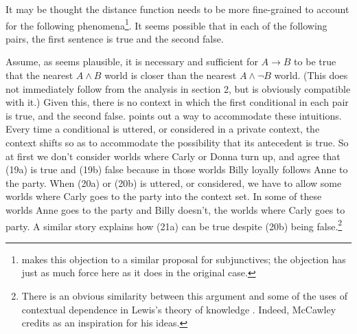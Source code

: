 It may be thought the distance function needs to be more fine-grained to account for the following phenomena\footnote{\citet{Lewis1973a} makes this objection to a similar proposal for subjunctives; the objection has just as much force here as it does in the original case.}. It seems possible that in each of the following pairs, the first sentence is true and the second false. 


\noindent Assume, as seems plausible, it is necessary and sufficient for \(A \rightarrow B\) to be true that the nearest \(A \wedge B\) world is closer than the nearest \(A\wedge \neg B\) world. (This does not immediately follow from the analysis in section 2, but is obviously compatible with it.) Given this, there is no context in which the first conditional in each pair is true, and the second false. \citet{McCawley1996} points out a way to accommodate these intuitions. Every time a conditional is uttered, or considered in a private context, the context shifts so as to accommodate the possibility that its antecedent is true. So at first we don't consider worlds where Carly or Donna turn up, and agree that (19a) is true and (19b) false because in those worlds Billy loyally follows Anne to the party. When (20a) or (20b) is uttered, or considered, we have to allow some worlds where Carly goes to the party into the context set. In some of these worlds Anne goes to the party and Billy doesn't, the worlds where Carly goes to party. A similar story explains how (21a) can be true despite (20b) being false.\footnote{There is an obvious similarity between this argument and some of the uses of contextual dependence in Lewis's theory of knowledge \citep{Lewis1996b}. Indeed, McCawley credits \citet{Lewis1979f} as an inspiration for his ideas.}

